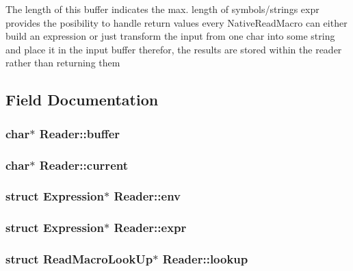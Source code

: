 The length of this buffer indicates the max. length of symbols/strings expr provides the posibility to handle return values every Native\+Read\+Macro can either build an expression or just transform the input from one char into some string and place it in the input buffer therefor, the results are stored within the reader rather than returning them 

\subsection{Field Documentation}
\hypertarget{structReader_a1c37d0d8180619f0d46e938557fc6db7}{
\subsubsection[{buffer}]{\setlength{\rightskip}{0pt plus 5cm}char$\ast$ Reader\+::buffer}}\label{structReader_a1c37d0d8180619f0d46e938557fc6db7}
\hypertarget{structReader_a04492be827cfe1cb7974b61b65291b72}{
\subsubsection[{current}]{\setlength{\rightskip}{0pt plus 5cm}char$\ast$ Reader\+::current}}\label{structReader_a04492be827cfe1cb7974b61b65291b72}
\hypertarget{structReader_ac5fc65c1058404fca08c43a02aeda206}{
\subsubsection[{env}]{\setlength{\rightskip}{0pt plus 5cm}struct Expression$\ast$ Reader\+::env}}\label{structReader_ac5fc65c1058404fca08c43a02aeda206}
\hypertarget{structReader_abf488edc3cddacd7890d3cbbe975a49b}{
\subsubsection[{expr}]{\setlength{\rightskip}{0pt plus 5cm}struct Expression$\ast$ Reader\+::expr}}\label{structReader_abf488edc3cddacd7890d3cbbe975a49b}
\hypertarget{structReader_ab499edf7fb5b8117242b1b786c4ab378}{
\subsubsection[{lookup}]{\setlength{\rightskip}{0pt plus 5cm}struct {\bf Read\+Macro\+Look\+Up}$\ast$ Reader\+::lookup}}\label{structReader_ab499edf7fb5b8117242b1b786c4ab378}
